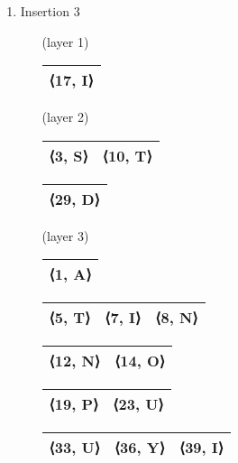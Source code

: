 \documentclass{article}
\begin{document}
\begin{enumerate}
    \item Insertion 3
    \begin{enumerate}
        \item [(layer 1)]
            \begin{tabular}{|c|}
                \hline
                 ⟨17, I⟩ \\
                 \hline
            \end{tabular} \;
        \item [(layer 2)]
            \begin{tabular}{|c|c|}
                \hline
                 ⟨3, S⟩ & ⟨10, T⟩ \\
                \hline
            \end{tabular} \;
            \begin{tabular}{|c|}
                \hline
                 ⟨29, D⟩ \\
                \hline
            \end{tabular} \;
        \item [(layer 3)]
            \begin{tabular}{|c|}
                \hline
                    ⟨1, A⟩ \\
                \hline
            \end{tabular} \;
            \begin{tabular}{|c|c|c|}
                \hline
                    ⟨5, T⟩ & ⟨7, I⟩ & ⟨8, N⟩ \\
                \hline
            \end{tabular} \;
            \begin{tabular}{|c|c|}
                \hline
                    ⟨12, N⟩ & ⟨14, O⟩ \\
                \hline
            \end{tabular} \;
            \begin{tabular}{|c|c|}
                \hline
                    ⟨19, P⟩ & ⟨23, U⟩ \\
                \hline
            \end{tabular} \;
            \begin{tabular}{|c|c|c|}
                \hline
                    ⟨33, U⟩ & ⟨36, Y⟩ & ⟨39, I⟩ \\
                \hline
            \end{tabular} \;
    \end{enumerate}
    

\end{enumerate}
\end{document}
